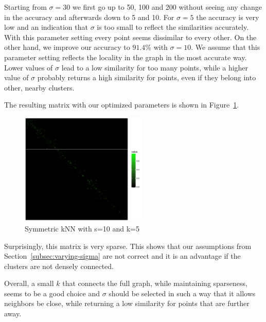 \documentclass{support/acm_proc_article-sp}
\begin{document}
    Starting from $\sigma = 30$ we first go up to 50, 100 and 200 without seeing any change in the accuracy and
    afterwards down to 5 and 10.
    For $\sigma = 5$ the accuracy is very low and an indication that $\sigma$ is too small to reflect the
    similarities accurately.
    With this parameter setting every point seems dissimilar to every other.
    On the other hand, we improve our accuracy to $91.4\%$ with $\sigma = 10$.
    We assume that this parameter setting reflects the locality in the graph in the most accurate way.
    Lower values of $\sigma$ lead to a low similarity for too many points, while a higher value of $\sigma$
    probably returns a high similarity for points, even if they belong into other, nearby clusters.

    The resulting matrix with our optimized parameters is shown in Figure~\ref{fig:3d-optimal}.
    \begin{figure}[htbp]
        \centering
        \includegraphics[width=6cm]{images/3d-optimal.png}
        \caption{Symmetric kNN with s=10 and k=5}
        \label{fig:3d-optimal}
    \end{figure}
    Surprisingly, this matrix is very sparse.
    This shows that our assumptions from Section~\ref{subsec:varying-sigma} are not correct and it is an advantage
    if the clusters are not densely connected.

    Overall, a small $k$ that connects the full graph, while maintaining sparseness, seems to be a good choice
    and $\sigma$ should be selected in such a way that it allows neighbors be close, while returning a low similarity for
    points that are further away.


    
    
\end{document}
